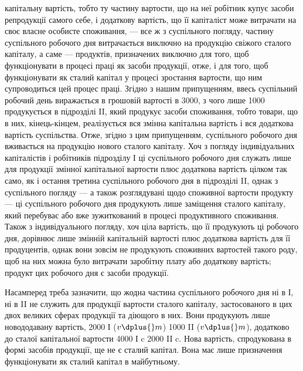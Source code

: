 \parcont{}  %
капітальну вартість, тобто ту частину вартости, що на неї робітник купує
засоби репродукції самого себе, і додаткову вартість, що її капіталіст
може витрачати на своє власне особисте споживання, — все ж з суспільного
погляду, частину суспільного робочого дня витрачається виключно на
продукцію свіжого сталого капіталу, а саме — продуктів, призначених
виключно для того, щоб функціонувати в процесі праці як засоби
продукції, отже, і для того, щоб функціонувати як сталий капітал у
процесі зростання вартости, що ним супроводиться цей процес праці.
Згідно з нашим припущенням, ввесь суспільний робочий день виражається в
грошовій вартості в 3000, з чого лише  \deq{} 1000 продукується в підрозділі
II, який продукує засоби споживання, тобто товари, що в них, кінець-кінцем,
реалізується вся змінна капітальна вартість і вся додаткова вартість
суспільства. Отже, згідно з цим припущенням,  суспільного робочого
дня вживається на продукцію нового сталого капіталу. Хоч з погляду
індивідуальних капіталістів і робітників підрозділу І ці  суспільного
робочого дня служать лише для продукції змінної капітальної вартости
плюс додаткова вартість цілком так само, як і остання третина суспільного
робочого дня в підрозділі II, однак з суспільного погляду — а
також розглядувані щодо споживної вартости продукту — ці  суспільного
робочого дня продукують лише заміщення сталого капіталу, який
перебуває або вже зужиткований в процесі продуктивного споживання.
Також з індивідуального погляду, хоч ціла вартість, що її продукують ці
 робочого дня, дорівнює лише змінній капітальній вартості плюс додаткова
вартість для її продуцентів, однак вони зовсім не продукують
споживних вартостей такого роду, щоб на них можна було витрачати
заробітну плату або додаткову вартість; продукт цих  робочого дня є
засоби продукції.

Насамперед треба зазначити, що жодна частина суспільного робочого
дня ні в І, ні в II не служить для продукції вартости сталого капіталу,
застосованого в цих двох великих сферах продукції та діющого в них.
Вони продукують лише новододавану вартість, 2000 І ($v \dplus{} m$) \dplus{} 1000
II ($v \dplus{} m$), додатково до сталої капітальної вартости \deq{} 4000 І c \dplus{} 2000
II c. Нова вартість, спродукована в формі засобів продукції, ще не є
сталий капітал. Вона має лише призначення функціонувати як сталий
капітал в майбутньому.

